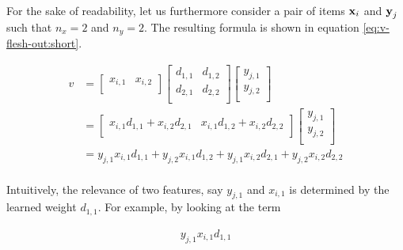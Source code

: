 For the sake of readability, let us furthermore consider a pair of items $\boldsymbol{\mathbf{x}}_i$ and $\boldsymbol{\mathbf{y}}_j$ such that $n_x = 2$ and $n_y = 2$. The resulting formula is shown in equation \ref{eq:v-flesh-out:short}.

\begin{equation} \label{eq:v-flesh-out:short}
    \begin{split} 
        v &= 
            \begin{bmatrix}
                x_{i,1} & x_{i,2} \\
            \end{bmatrix}
            \begin{bmatrix}
                d_{1,1} & d_{1,2} \\
                d_{2,1} & d_{2,2} \\
            \end{bmatrix}
            \begin{bmatrix}
                y_{j,1} \\
                y_{j,2} \\
            \end{bmatrix} \\
        &=
            \begin{bmatrix}
                x_{i,1}d_{1,1} + x_{i,2}d_{2,1} & x_{i,1}d_{1,2} + x_{i,2}d_{2,2} \\
            \end{bmatrix}    
            \begin{bmatrix}
                y_{j,1} \\
                y_{j,2} \\
            \end{bmatrix} \\
        &= 
            y_{j,1}x_{i,1}d_{1,1} + y_{j,2}x_{i,1}d_{1,2} + y_{j,1}x_{i,2}d_{2,1} + y_{j,2}x_{i,2}d_{2,2} \\
    \end{split}
\end{equation}

Intuitively, the relevance of two features, say $y_{j,1}$ and $x_{i,1}$ is determined by the learned weight $d_{1,1}$. For example, by looking at the term

\begin{equation} \nonumber
    \begin{split}
        y_{j,1}x_{i,1}d_{1,1}
    \end{split}
\end{equation}

